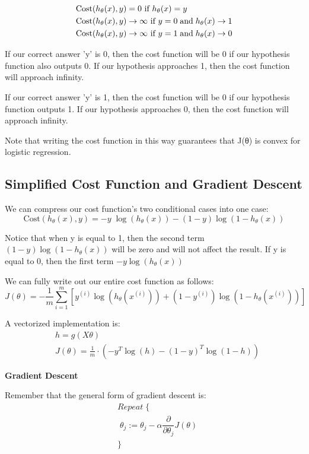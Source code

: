\documentclass{article}
\begin{document}
\begin{align*}
	& \mathrm{Cost}(h_\theta(x),y) = 0 \text{ if } h_\theta(x) = y \\ 
	& \mathrm{Cost}(h_\theta(x),y) \rightarrow \infty \text{ if } y = 0 \; \mathrm{and} \; h_\theta(x) \rightarrow 1 \\ 
	& \mathrm{Cost}(h_\theta(x),y) \rightarrow \infty \text{ if } y = 1 \; \mathrm{and} \; h_\theta(x) \rightarrow 0 \newline 
\end{align*}

If our correct answer 'y' is 0, then the cost function will be 0 if our hypothesis function also outputs 0. If our hypothesis approaches 1, then the cost function will approach infinity.

If our correct answer 'y' is 1, then the cost function will be 0 if our hypothesis function outputs 1. If our hypothesis approaches 0, then the cost function will approach infinity.

Note that writing the cost function in this way guarantees that J(θ) is convex for logistic regression.

\subsection{Simplified Cost Function and Gradient Descent}
We can compress our cost function's two conditional cases into one case:
$$\mathrm{Cost}(h_\theta(x),y) = - y \; \log(h_\theta(x)) - (1 - y) \log(1 - h_\theta(x))$$

Notice that when y is equal to 1, then the second term $(1-y)\log(1-h_\theta(x))$ will be zero and will not affect the result. If y is equal to 0, then the first term $-y \log(h_\theta(x))$

We can fully write out our entire cost function as follows:
$$J(\theta) = - \frac{1}{m} \displaystyle \sum_{i=1}^m [y^{(i)}\log (h_\theta (x^{(i)})) + (1 - y^{(i)})\log (1 - h_\theta(x^{(i)}))]$$

A vectorized implementation is:
\begin{align*} 
	& h = g(X\theta)\\ 
	& J(\theta) = \frac{1}{m} \cdot \left(-y^{T}\log(h)-(1-y)^{T}\log(1-h)\right)
\end{align*}

\textbf{Gradient Descent}

Remember that the general form of gradient descent is:
\begin{align*}
	& Repeat \; \lbrace \\ 
	& \; \theta_j := \theta_j - \alpha \dfrac{\partial}{\partial \theta_j}J(\theta) \\ 
	& \rbrace
\end{align*}
\end{document}
